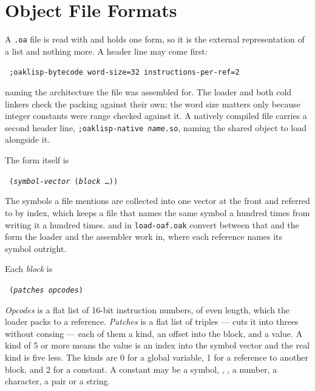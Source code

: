 

\section{Object File Formats}

A \texttt{.oa} file is read with  and holds one form, so it
is the external representation of a list and nothing more.  A header
line may come first:

\begin{flushleft}\tt
;oaklisp-bytecode word-size=32 instructions-per-ref=2
\end{flushleft}

naming the architecture the file was assembled for.  The loader and
both cold linkers check the packing against their own; the word size
matters only because integer constants were range checked against
it.  A natively compiled file carries a second header line,
\texttt{;oaklisp-native \emph{name}\texttt{.so}}, naming the shared
object to load alongside it.

The form itself is

\begin{flushleft}\tt
(\emph{symbol-vector} (\emph{block} \ldots))
\end{flushleft}

The symbols a file mentions are collected into one vector at the
front and referred to by index, which keeps a file that names the
same symbol a hundred times from writing it a hundred times.
 and  in \texttt{load-oaf.oak}
convert between that and the form the loader and the assembler work
in, where each reference names its symbol outright.

Each \emph{block} is

\begin{flushleft}\tt
(\emph{patches} \emph{opcodes})
\end{flushleft}

\emph{Opcodes} is a flat list of 16-bit instruction numbers, of even
length, which the loader packs
 to a reference.  \emph{Patches} is a
flat list of triples ---  cuts it into threes without
consing --- each of them a kind, an offset into the block, and a
value.  A kind of 5 or more means the value is an index into the
symbol vector and the real kind is five less.  The kinds are 0 for a
global variable, 1 for a reference to another block, and 2 for a
constant.  A constant may be a symbol, \df{()}, , a number, a
character, a pair or a string.

